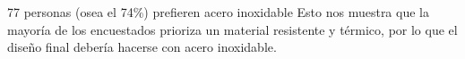 
77 personas (osea el 74\%) prefieren acero inoxidable
Esto nos muestra que la mayoría de los encuestados prioriza un material resistente y térmico, por lo que el diseño final debería hacerse con acero inoxidable.